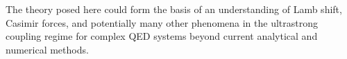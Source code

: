 \documentclass[aps,prl,twocolumn,
	groupedaddress,superscriptaddress,
	amsfonts,amssymb,amsmath,floatfix,
	citeautoscript]{revtex4-1}
\newcommand{\Jadd}[1]{\textcolor{blue}{#1}}
\begin{document}
The theory posed here could form the basis of an understanding of Lamb shift, Casimir forces, and potentially many other phenomena in the ultrastrong coupling regime for complex QED systems beyond current analytical and numerical methods.



%
\end{document}
